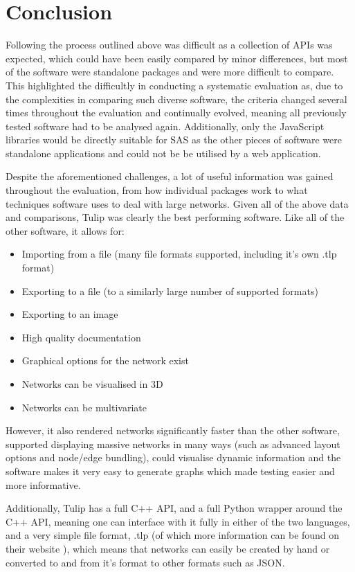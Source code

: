 \documentclass[../dissertation.tex]{subfiles}
\begin{document}
\section{Conclusion}

Following the process outlined above was difficult as a collection of APIs was expected, which could have been easily compared by minor differences, but most of the software were standalone packages and were more difficult to compare. This highlighted the difficultly in conducting a systematic evaluation as, due to the complexities in comparing such diverse software, the criteria changed several times throughout the evaluation and continually evolved, meaning all previously tested software had to be analysed again. Additionally, only the JavaScript libraries would be directly suitable for SAS as the other pieces of software were standalone applications and could not be be utilised by a web application.

Despite the aforementioned challenges, a lot of useful information was gained throughout the evaluation, from how individual packages work to what techniques software uses to deal with large networks. Given all of the above data and comparisons, Tulip was clearly the best performing software. Like all of the other software, it allows for:
\begin{itemize}
    \item Importing from a file (many file formats supported, including it's own .tlp format)
    \item Exporting to a file (to a similarly large number of supported formats)
    \item Exporting to an image
    \item High quality documentation
    \item Graphical options for the network exist
    \item Networks can be visualised in 3D
    \item Networks can be multivariate
\end{itemize}

However, it also rendered networks significantly faster than the other software, supported displaying massive networks in many ways (such as advanced layout options and node/edge bundling), could visualise dynamic information and the software makes it very easy to generate graphs which made testing easier and more informative. 

Additionally, Tulip has a full C++ API, and a full Python wrapper around the C++ API, meaning one can interface with it fully in either of the two languages, and a very simple file format, .tlp (of which more information can be found on their website \cite{tuliptlp}), which means that networks can easily be created by hand or converted to and from it's format to other formats such as JSON.
\end{document}

